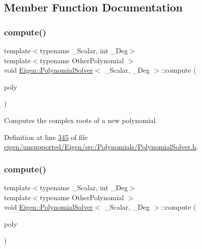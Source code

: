 \subsection{Member Function Documentation}
\mbox{\label{class_eigen_1_1_polynomial_solver_ac3ceae48528f3798d44c15a025cb03b8}} 
\subsubsection{\texorpdfstring{compute()}{compute()}\hspace{0.1cm}{\footnotesize\ttfamily [1/2]}}
{\footnotesize\ttfamily template$<$typename \+\_\+\+Scalar, int \+\_\+\+Deg$>$ \\
template$<$typename Other\+Polynomial $>$ \\
void \hyperlink{class_eigen_1_1_polynomial_solver}{Eigen\+::\+Polynomial\+Solver}$<$ \+\_\+\+Scalar, \+\_\+\+Deg $>$\+::compute (\begin{DoxyParamCaption}\item[{const Other\+Polynomial \&}]{poly }\end{DoxyParamCaption})\hspace{0.3cm}{\ttfamily [inline]}}

Computes the complex roots of a new polynomial. 

Definition at line \hyperlink{eigen_2unsupported_2_eigen_2src_2_polynomials_2_polynomial_solver_8h_source_l00345}{345} of file \hyperlink{eigen_2unsupported_2_eigen_2src_2_polynomials_2_polynomial_solver_8h_source}{eigen/unsupported/\+Eigen/src/\+Polynomials/\+Polynomial\+Solver.\+h}.

\mbox{\label{class_eigen_1_1_polynomial_solver_ac3ceae48528f3798d44c15a025cb03b8}} 
\subsubsection{\texorpdfstring{compute()}{compute()}\hspace{0.1cm}{\footnotesize\ttfamily [2/2]}}
{\footnotesize\ttfamily template$<$typename \+\_\+\+Scalar, int \+\_\+\+Deg$>$ \\
template$<$typename Other\+Polynomial $>$ \\
void \hyperlink{class_eigen_1_1_polynomial_solver}{Eigen\+::\+Polynomial\+Solver}$<$ \+\_\+\+Scalar, \+\_\+\+Deg $>$\+::compute (\begin{DoxyParamCaption}\item[{const Other\+Polynomial \&}]{poly }\end{DoxyParamCaption})\hspace{0.3cm}{\ttfamily [inline]}}

